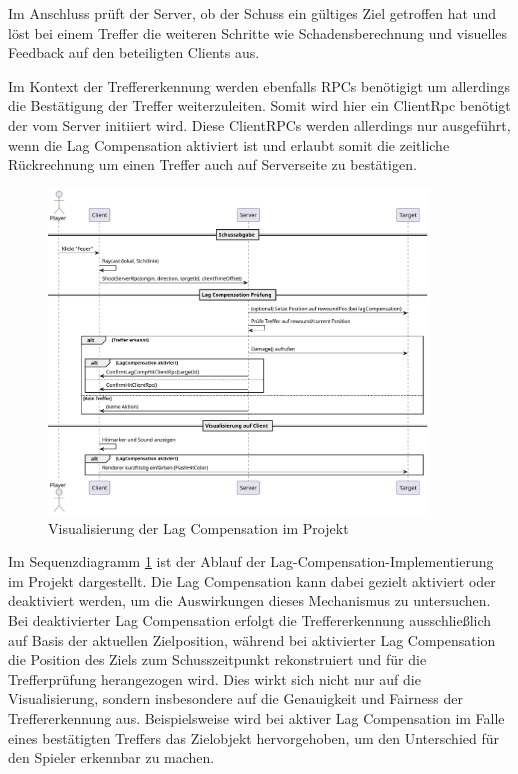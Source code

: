 \begin{enumerate}
Im Anschluss prüft der Server, ob der Schuss ein gültiges Ziel getroffen hat und löst bei einem Treffer die weiteren Schritte wie Schadensberechnung und visuelles Feedback auf den beteiligten Clients aus.

Im Kontext der Treffererkennung werden ebenfalls RPCs benötigigt um allerdings die Bestätigung der Treffer weiterzuleiten. Somit wird hier ein ClientRpc benötigt der vom Server initiiert wird. Diese ClientRPCs werden allerdings nur ausgeführt, wenn die Lag Compensation aktiviert ist und erlaubt somit die zeitliche Rückrechnung um einen Treffer auch auf Serverseite zu bestätigen.


\newpage

\begin{figure}[h] 
  \centering
  \includegraphics[width=0.9\textwidth, keepaspectratio]{out/diagrams/target-comp/target-comp.pdf} %
  \caption{Visualisierung der Lag Compensation im Projekt}
  \label{fig:target-comp} %
\end{figure}

\newpage
Im Sequenzdiagramm \ref{fig:target-comp} ist der Ablauf der Lag-Compensation-Implementierung im Projekt dargestellt. Die Lag Compensation kann dabei gezielt aktiviert oder deaktiviert werden, um die Auswirkungen dieses Mechanismus zu untersuchen. Bei deaktivierter Lag Compensation erfolgt die Treffererkennung ausschließlich auf Basis der aktuellen Zielposition, während bei aktivierter Lag Compensation die Position des Ziels zum Schusszeitpunkt rekonstruiert und für die Trefferprüfung herangezogen wird. Dies wirkt sich nicht nur auf die Visualisierung, sondern insbesondere auf die Genauigkeit und Fairness der Treffererkennung aus. Beispielsweise wird bei aktiver Lag Compensation im Falle eines bestätigten Treffers das Zielobjekt hervorgehoben, um den Unterschied für den Spieler erkennbar zu machen.


\end{enumerate}
